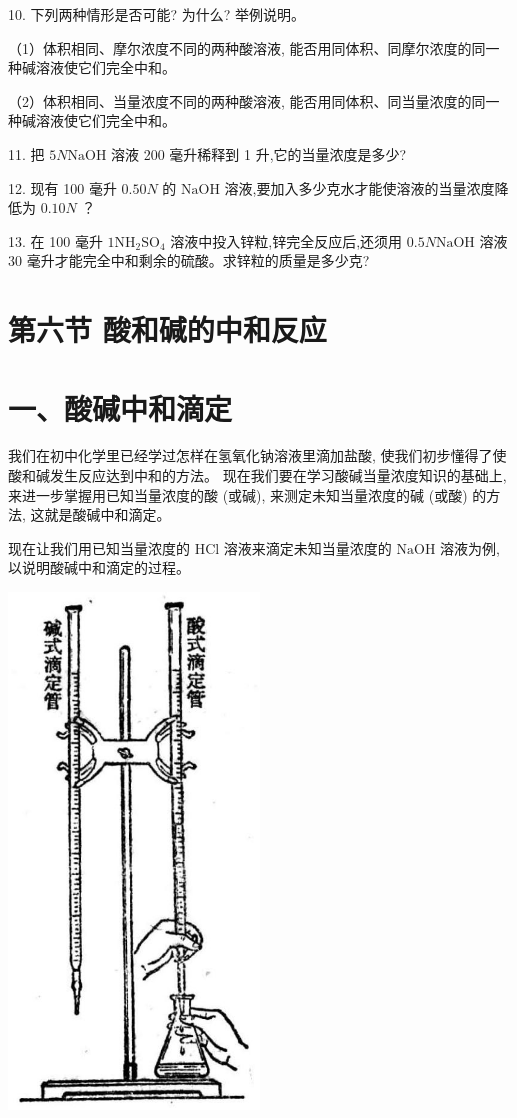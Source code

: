 \documentclass[10pt]{article}
\begin{document}
10. 下列两种情形是否可能? 为什么? 举例说明。

（1）体积相同、摩尔浓度不同的两种酸溶液, 能否用同体积、同摩尔浓度的同一种碱溶液使它们完全中和。

（2）体积相同、当量浓度不同的两种酸溶液, 能否用同体积、同当量浓度的同一种碱溶液使它们完全中和。

11. 把 \({5N}\mathrm{{NaOH}}\) 溶液 200 毫升稀释到 1 升,它的当量浓度是多少?

12. 现有 100 毫升 \({0.50N}\) 的 \(\mathrm{{NaOH}}\) 溶液,要加入多少克水才能使溶液的当量浓度降低为 \({0.10N}\) ？

13. 在 100 毫升 \(1{\mathrm{{NH}}}_{2}{\mathrm{{SO}}}_{4}\) 溶液中投入锌粒,锌完全反应后,还须用 \({0.5N}\mathrm{{NaOH}}\) 溶液 30 毫升才能完全中和剩余的硫酸。求锌粒的质量是多少克?

\section*{第六节 酸和碱的中和反应}

\section*{一、酸碱中和滴定}

我们在初中化学里已经学过怎样在氢氧化钠溶液里滴加盐酸, 使我们初步懂得了使酸和碱发生反应达到中和的方法。 现在我们要在学习酸碱当量浓度知识的基础上, 来进一步掌握用已知当量浓度的酸 (或碱), 来测定未知当量浓度的碱 (或酸) 的方法, 这就是酸碱中和滴定。

现在让我们用已知当量浓度的 \(\mathrm{{HCl}}\) 溶液来滴定未知当量浓度的 \(\mathrm{{NaOH}}\) 溶液为例,以说明酸碱中和滴定的过程。

\begin{center}
\includegraphics[max width=0.5\textwidth]{images/01912d13-9986-7822-a012-3f3f7be99dcb_156_776291.jpg}
\end{center}
\end{document}
